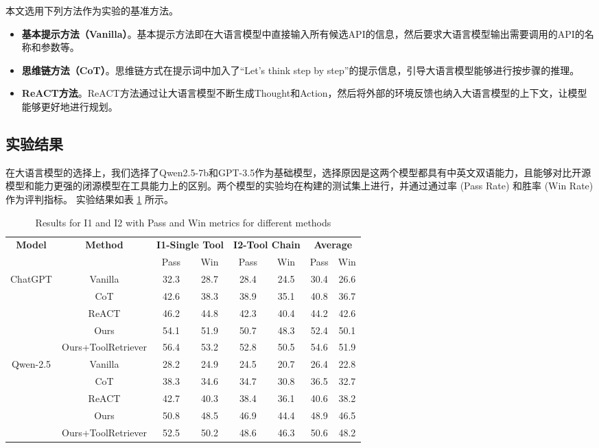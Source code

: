本文选用下列方法作为实验的基准方法。

\begin{itemize}
  \item  \textbf{基本提示方法（Vanilla）}。基本提示方法即在大语言模型中直接输入所有候选API的信息，然后要求大语言模型输出需要调用的API的名称和参数等。
  \item  \textbf{思维链方法（CoT）}\cite{Wang2023a}。思维链方式在提示词中加入了“Let's think step by step”的提示信息，引导大语言模型能够进行按步骤的推理。
  \item  \textbf{ReACT方法}\cite{Yao2023b}。ReACT方法通过让大语言模型不断生成Thought和Action，然后将外部的环境反馈也纳入大语言模型的上下文，让模型能够更好地进行规划。
\end{itemize}
\indent

\subsection{实验结果}

在大语言模型的选择上，我们选择了Qwen2.5-7b和GPT-3.5作为基础模型，选择原因是这两个模型都具有中英文双语能力，且能够对比开源模型和能力更强的闭源模型在工具能力上的区别。两个模型的实验均在构建的测试集上进行，并通过通过率 (Pass Rate) 和胜率 (Win Rate) 作为评判指标。
实验结果如表 \ref{tab:simplified_pass_win} 所示。

\begin{table}[!ht]
  \centering
  \begin{tabular}{c|c|cc|cc|cc}
  \toprule
  \textbf{Model} & \textbf{Method} & \multicolumn{2}{c|}{\textbf{I1-Single Tool}} & \multicolumn{2}{c|}{\textbf{I2-Tool Chain}} & \multicolumn{2}{c}{\textbf{Average}} \\
  & & Pass & Win & Pass & Win & Pass & Win \\
  \midrule
  ChatGPT & Vanilla          & 32.3 & 28.7 & 28.4 & 24.5 & 30.4 & 26.6 \\
          & CoT              & 42.6 & 38.3 & 38.9 & 35.1 & 40.8 & 36.7 \\
          & ReACT            & 46.2 & 44.8 & 42.3 & 40.4 & 44.2 & 42.6 \\
          & Ours             & 54.1 & 51.9 & 50.7 & 48.3 & 52.4 & 50.1 \\
          & Ours+ToolRetriever & 56.4 & 53.2 & 52.8 & 50.5 & 54.6 & 51.9 \\
  \midrule
  Qwen-2.5 & Vanilla          & 28.2 & 24.9 & 24.5 & 20.7 & 26.4 & 22.8 \\
           & CoT              & 38.3 & 34.6 & 34.7 & 30.8 & 36.5 & 32.7 \\
           & ReACT            & 42.7 & 40.3 & 38.4 & 36.1 & 40.6 & 38.2 \\
           & Ours             & 50.8 & 48.5 & 46.9 & 44.4 & 48.9 & 46.5 \\
           & Ours+ToolRetriever & 52.5 & 50.2 & 48.6 & 46.3 & 50.6 & 48.2 \\
  \bottomrule
  \end{tabular}
  \caption{Results for I1 and I2 with Pass and Win metrics for different methods}
  \label{tab:simplified_pass_win}
\end{table}

